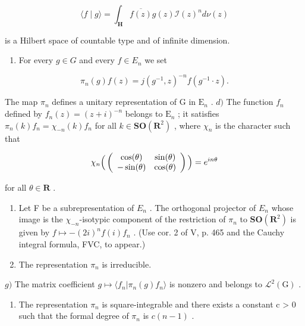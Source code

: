 \[
\langle f \mid g \rangle = \int_ {\mathbf {H}} \overline {{f (z)}} g (z) \mathcal {I} (z) ^ {n} d \nu (z)
\]

is a Hilbert space of countable type and of infinite dimension.

\begin{enumerate}
\def\labelenumi{\alph{enumi})}
\setcounter{enumi}{2}
\tightlist
\item
  For every \(g \in G\) and every \(f \in E_{n}\) we set
\end{enumerate}

\[
\pi_ {n} (g) f (z) = j (g ^ {- 1}, z) ^ {- n} f (g ^ {- 1} \cdot z).
\]

The map \(\pi_n\) defines a unitary representation of G in \(\mathrm{E}_n\) . \(d)\) The function \(f_n\) defined by \(f_n(z) = (z + i)^{-n}\) belongs to \(\mathrm{E}_n\) ; it satisfies \(\pi_n(k)f_n = \chi_{-n}(k)f_n\) for all \(k \in \mathbf{SO}(\mathbf{R}^2)\) , where \(\chi_n\) is the character such that

\[
\chi_ {n} \Big (\left( \begin{array}{c c} \cos (\theta) & \sin (\theta) \\ - \sin (\theta) & \cos (\theta) \end{array} \right) \Big) = e ^ {i n \theta}
\]

for all \(\theta\in\mathbf{R}\) .

\begin{enumerate}
\def\labelenumi{\alph{enumi})}
\setcounter{enumi}{4}
\item
  Let F be a subrepresentation of \(E_{n}\) . The orthogonal projector of \(E_{n}\) whose image is the \(\chi_{-n}\)-isotypic component of the restriction of \(\pi_{n}\) to \(\mathbf{SO}(\mathbf{R}^{2})\) is given by \(f \mapsto -(2i)^{n}f(i)f_{n}\) . (Use cor. 2 of V, p. 465 and the Cauchy integral formula, FVC, to appear.)
\item
  The representation \(\pi_n\) is irreducible.
\end{enumerate}

\(g)\) The matrix coefficient \(g \mapsto \langle f_n | \pi_n(g)f_n \rangle\) is nonzero and belongs to \(\mathcal{L}^2(\mathrm{G})\) .

\begin{enumerate}
\def\labelenumi{\alph{enumi})}
\setcounter{enumi}{7}
\tightlist
\item
  The representation \(\pi_{n}\) is square-integrable and there exists a constant c > 0 such that the formal degree of \(\pi_{n}\) is \(c(n - 1)\) .
\end{enumerate}

